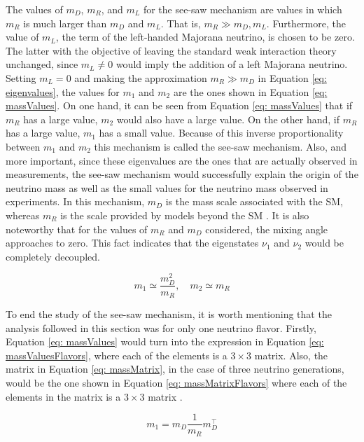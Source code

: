 The values of $m_{D}$, $m_{R}$, and $m_{L}$ for the see-saw mechanism are values in which $m_{R}$ is much larger than $m_{D}$ and $m_{L}$. That is, $m_{R} \gg m_{D}, m_{L}$. Furthermore, the value of $m_{L}$, the term of the left-handed Majorana neutrino, is chosen to be zero. The latter with the objective of leaving the standard weak interaction theory unchanged, since $m_{L} \neq 0$ would imply the addition of a left Majorana neutrino. Setting $m_{L} = 0$ and making the approximation $m_{R} \gg m_{D}$ in Equation \ref{eq: eigenvalues}, the values for $m_{1}$ and $m_{2}$ are the ones shown in Equation \ref{eq: massValues}. On one hand, it can be seen from Equation \ref{eq: massValues} that if $m_{R}$ has a large value, $m_{2}$ would also have a large value. On the other hand, if $m_{R}$ has a large value, $m_{1}$ has a small value. Because of this inverse proportionality between $m_{1}$ and $m_{2}$ this mechanism is called the see-saw mechanism. Also, and more important, since these eigenvalues are the ones that are actually observed in measurements, the see-saw mechanism would successfully explain the origin of the neutrino mass as well as the small values for the neutrino mass observed in experiments. In this mechanism, $m_{D}$ is the mass scale associated with the SM, whereas $m_{R}$ is the scale provided by models beyond the SM \cite{NeutrinoMass}. It is also noteworthy that for the values of $m_{R}$ and $m_{D}$ considered, the mixing angle approaches to zero. This fact indicates that the eigenstates $\nu_{1}$ and $\nu_{2}$ would be completely decoupled.

\begin{equation}\label{eq: massValues}
m_{1} \simeq \frac{m_{D}^{2}}{m_{R}}, \quad m_{2} \simeq m_{R}
\end{equation}

To end the study of the see-saw mechanism, it is worth mentioning that the analysis followed in this section was for only one neutrino flavor. Firstly, Equation \ref{eq: massValues} would turn into the expression in Equation \ref{eq: massValuesFlavors}, where each of the elements is a $3 \times 3$ matrix. Also, the matrix in Equation \ref{eq: massMatrix}, in the case of three neutrino generations, would be the one shown in Equation \ref{eq: massMatrixFlavors} where each of the elements in the matrix is a $3 \times 3$ matrix \cite{NeutrinoMass}. 


\begin{equation}\label{eq: massValuesFlavors}
m_{1} = m_{D}\frac{1}{m_{R}}m_{D}^{\intercal}
\end{equation}

